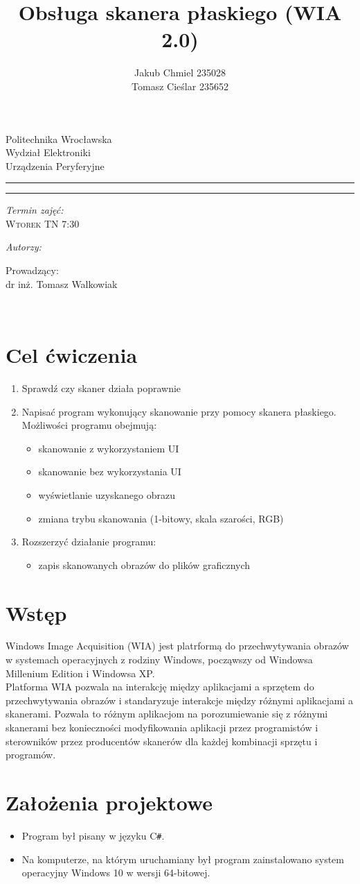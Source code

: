 \documentclass[12pt,a4paper,notitlepage]{report}
\author{ Jakub Chmiel  235028 \\ Tomasz Cieślar 235652}
\title{Obsługa skanera płaskiego (WIA 2.0)}
\makeatletter
\newcommand{\linia}{\rule{\linewidth}{0.4mm}}
\renewcommand{\maketitle}{\begin{titlepage}
    \vspace*{1cm}
    \begin{center}\small
    Politechnika Wrocławska\\
    Wydział Elektroniki\\
    Urządzenia Peryferyjne 
    \end{center}
    \vspace{4.5cm}
    \noindent\linia
    \begin{center}
      \LARGE \textsc{\@title}
         \end{center}
     \linia
    \vspace{0.5cm}
    \begin{flushright}
    \begin{minipage}{6cm}
    
     \vspace{4cm}
     \textit{\small Termin zajęć:}\\
     \normalsize \textsc{Wtorek TN 7:30} \par
	\vspace{0.3cm}    
    \textit{\small Autorzy:}\\
    \normalsize \textsc{\@author} \par
     \vspace{0.3cm}
        Prowadzący: \\ dr inż. Tomasz Walkowiak

    \end{minipage}
    \vspace{1cm}
     {\small }\\
       
     \end{flushright}
    \vspace*{\stretch{3}}
    \begin{center}
    \@date
    \end{center}
  \end{titlepage}%
}
\makeatother
\begin{document}
\maketitle

\newpage
\tableofcontents
\newpage
\renewcommand*\thesection{\arabic{section}}
\section{Cel ćwiczenia}
\begin{enumerate}
\item Sprawdź czy skaner działa poprawnie
\item Napisać program wykonujący skanowanie przy pomocy skanera płaskiego.\\Możliwości programu obejmują:
\begin{itemize}
\item skanowanie z wykorzystaniem  UI
\item skanowanie bez wykorzystania  UI
\item wyświetlanie uzyskanego obrazu
\item zmiana trybu skanowania (1-bitowy, skala szarości, RGB)
\end{itemize}
\item Rozszerzyć działanie programu:
\begin{itemize}
\item zapis skanowanych obrazów do plików graficznych
\end{itemize}
\end{enumerate}

\section{Wstęp}
Windows Image Acquisition (WIA) jest platrformą do przechwytywania obrazów w systemach operacyjnych z rodziny Windows, począwszy od Windowsa Millenium Edition i Windowsa XP.
\\
\indent Platforma WIA pozwala na interakcję między aplikacjami a sprzętem do przechwytywania obrazów i standaryzuje interakcje między różnymi aplikacjami a skanerami. Pozwala to różnym aplikacjom na porozumiewanie się z różnymi skanerami bez konieczności modyfikowania aplikacji przez programistów i sterowników przez producentów skanerów dla każdej kombinacji sprzętu i programów.

\section{Założenia projektowe}
\begin{itemize}
\item Program był pisany w języku C\texttt{\#}.
\item Na komputerze, na którym uruchamiany był program zainstalowano system operacyjny Windows 10 w wersji 64-bitowej.
\end{itemize}
\end{document}
